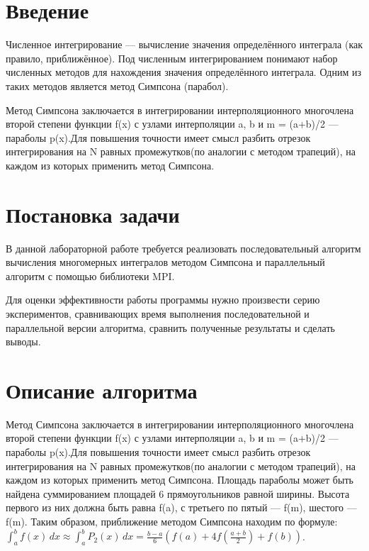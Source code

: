 \documentclass{report}
\begin{document}
\setcounter{page}{2}

\tableofcontents
\newpage

\section*{Введение}
\par Численное интегрирование — вычисление значения определённого интеграла (как правило, приближённое). Под численным интегрированием понимают набор численных методов для нахождения значения определённого интеграла. Одним из таких методов является метод Симпсона (парабол).
\par Метод Симпсона заключается в интегрировании интерполяционного многочлена второй степени функции f(x) с узлами интерполяции a, b и m = (a+b)/2 — параболы p(x).Для повышения точности имеет смысл разбить отрезок интегрирования на N равных промежутков(по аналогии с методом трапеций), на каждом из которых применить метод Симпсона. 
\newpage

\section*{Постановка задачи}
\par В данной лабораторной работе требуется реализовать последовательный алгоритм вычисления многомерных интегралов методом Симпсона и параллельный алгоритм с помощью библиотеки MPI.
\par Для оценки эффективности работы программы нужно произвести серию экспериментов, сравнивающих время выполнения последовательной и параллельной версии алгоритма, сравнить полученные результаты и сделать выводы.
\newpage

\section*{Описание алгоритма}
\par
Метод Симпсона заключается в интегрировании интерполяционного многочлена второй степени функции f(x) с узлами интерполяции a, b и m = (a+b)/2 — параболы p(x).Для повышения точности имеет смысл разбить отрезок интегрирования на N равных промежутков(по аналогии с методом трапеций), на каждом из которых применить метод Симпсона.
Площадь параболы может быть найдена суммированием площадей 6 прямоугольников равной ширины. Высота первого из них должна быть равна f(a), с третьего по пятый — f(m), шестого — f(m). Таким образом, приближение методом Симпсона находим по формуле:
$\displaystyle {\int_{a}^{b} f(x) \, dx }\approx {\int_{a}^{b} P_{2}(x) \, dx}=\frac  {b-a}{6}{\left(f(a)+4f\left({\frac  {a+b}{2}}\right)+f(b)\right)}$.
\end{document}

